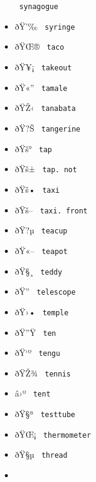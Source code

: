 \begin{itemize}
{  \texttt{\ synagogue\ }}
\item
  \label{symbol-syringe}{{ ðŸ'‰ } \texttt{\ syringe\ }}
\item
  \label{symbol-taco}{{ ðŸŒ® } \texttt{\ taco\ }}
\item
  \label{symbol-takeout}{{ ðŸ¥¡ } \texttt{\ takeout\ }}
\item
  \label{symbol-tamale}{{ ðŸ«'' } \texttt{\ tamale\ }}
\item
  \label{symbol-tanabata}{{ ðŸŽ‹ } \texttt{\ tanabata\ }}
\item
  \label{symbol-tangerine}{{ ðŸ?Š }
  \texttt{\ tangerine\ }}
\item
  \label{symbol-tap}{{ ðŸš° } \texttt{\ tap\ }}
\item
  \label{symbol-tap.not}{{ ðŸš± } \texttt{\ tap.\ not\ }}
\item
  \label{symbol-taxi}{{ ðŸš• } \texttt{\ taxi\ }}
\item
  \label{symbol-taxi.front}{{ ðŸš-- }
  \texttt{\ taxi.\ front\ }}
\item
  \label{symbol-teacup}{{ ðŸ?µ } \texttt{\ teacup\ }}
\item
  \label{symbol-teapot}{{ ðŸ«-- } \texttt{\ teapot\ }}
\item
  \label{symbol-teddy}{{ ðŸ§¸ } \texttt{\ teddy\ }}
\item
  \label{symbol-telescope}{{ ðŸ''­ }
  \texttt{\ telescope\ }}
\item
  \label{symbol-temple}{{ ðŸ›• } \texttt{\ temple\ }}
\item
  \label{symbol-ten}{{ ðŸ''Ÿ } \texttt{\ ten\ }}
\item
  \label{symbol-tengu}{{ ðŸ`º } \texttt{\ tengu\ }}
\item
  \label{symbol-tennis}{{ ðŸŽ¾ } \texttt{\ tennis\ }}
\item
  \label{symbol-tent}{{ â›º } \texttt{\ tent\ }}
\item
  \label{symbol-testtube}{{ ðŸ§ª } \texttt{\ testtube\ }}
\item
  \label{symbol-thermometer}{{ ðŸŒ¡ }
  \texttt{\ thermometer\ }}
\item
  \label{symbol-thread}{{ ðŸ§µ } \texttt{\ thread\ }}
\item

\end{itemize}
